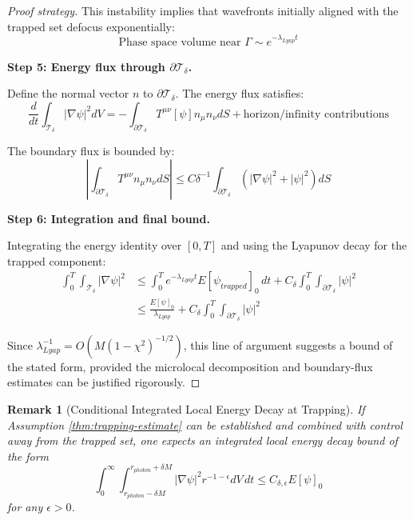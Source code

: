 \documentclass[12pt,a4paper]{article}
\newtheorem{remark}[theorem]{Remark}
\begin{document}
\begin{proof}[Proof strategy]
This instability implies that wavefronts initially aligned with the trapped set defocus exponentially:
\begin{equation}
\text{Phase space volume near }\Gamma \sim e^{-\lambda_{Lyap} t}
\end{equation}

\textbf{Step 5: Energy flux through $\partial\mathcal{T}_\delta$.}

Define the normal vector $n$ to $\partial\mathcal{T}_\delta$. The energy flux satisfies:
\begin{equation}
\frac{d}{dt}\int_{\mathcal{T}_\delta} |\nabla\psi|^2 dV = -\int_{\partial\mathcal{T}_\delta} T^{\mu\nu}[\psi]n_\mu n_\nu dS + \text{horizon/infinity contributions}
\end{equation}

The boundary flux is bounded by:
\begin{equation}
\left|\int_{\partial\mathcal{T}_\delta} T^{\mu\nu}n_\mu n_\nu dS\right| \leq C\delta^{-1}\int_{\partial\mathcal{T}_\delta} (|\nabla\psi|^2 + |\psi|^2) dS
\end{equation}

\textbf{Step 6: Integration and final bound.}

Integrating the energy identity over $[0, T]$ and using the Lyapunov decay for the trapped component:
\begin{align}
\int_0^T \int_{\mathcal{T}_\delta} |\nabla\psi|^2 &\leq \int_0^T e^{-\lambda_{Lyap}t} E[\psi_{trapped}]_0\, dt + C_\delta \int_0^T\int_{\partial\mathcal{T}_\delta} |\psi|^2 \\
&\leq \frac{E[\psi]_0}{\lambda_{Lyap}} + C_\delta \int_0^T\int_{\partial\mathcal{T}_\delta}|\psi|^2
\end{align}

Since $\lambda_{Lyap}^{-1} = O(M(1-\chi^2)^{-1/2})$, this line of argument suggests a bound of the stated form, provided the microlocal decomposition and boundary-flux estimates can be justified rigorously.
\end{proof}

\begin{remark}[Conditional Integrated Local Energy Decay at Trapping]
If Assumption \ref{thm:trapping-estimate} can be established and combined with control away from the trapped set, one expects an integrated local energy decay bound of the form
\begin{equation}
\int_0^\infty \int_{r_{photon} - \delta M}^{r_{photon} + \delta M} |\nabla\psi|^2 r^{-1-\epsilon} dV\, dt \leq C_{\delta,\epsilon} E[\psi]_0
\end{equation}
for any $\epsilon > 0$.
\end{remark}
\end{document}
